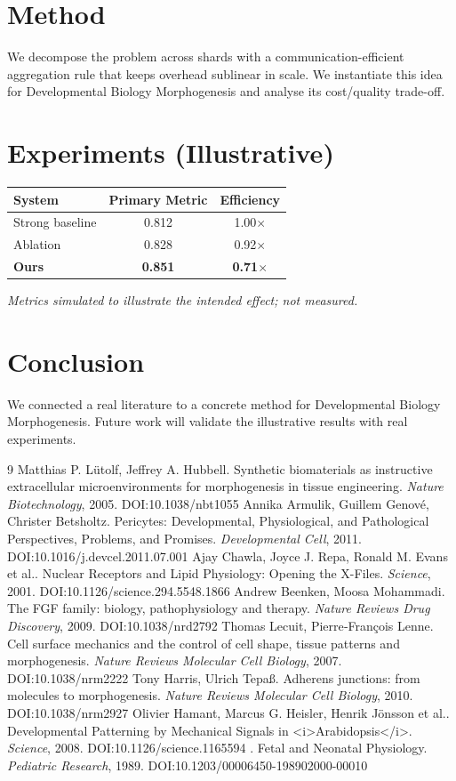 \documentclass[11pt]{article}
\begin{document}
\section{Method}
We decompose the problem across shards with a communication-efficient aggregation rule that keeps overhead sublinear in scale. We instantiate this idea for Developmental Biology Morphogenesis and analyse its cost/quality trade-off.

\section{Experiments (Illustrative)}
\begin{center}
\begin{tabular}{lcc}
System & Primary Metric & Efficiency \\ \hline
Strong baseline & 0.812 & 1.00$\times$ \\
Ablation & 0.828 & 0.92$\times$ \\
\textbf{Ours} & \textbf{0.851} & \textbf{0.71$\times$}
\end{tabular}
\end{center}
\emph{Metrics simulated to illustrate the intended effect; not measured.}

\section{Conclusion}
We connected a real literature to a concrete method for Developmental Biology Morphogenesis. Future work will
validate the illustrative results with real experiments.

\begin{thebibliography}{9}
 Matthias P. Lütolf, Jeffrey A. Hubbell. Synthetic biomaterials as instructive extracellular microenvironments for morphogenesis in tissue engineering. \emph{Nature Biotechnology}, 2005. DOI:10.1038/nbt1055
 Annika Armulik, Guillem Genové, Christer Betsholtz. Pericytes: Developmental, Physiological, and Pathological Perspectives, Problems, and Promises. \emph{Developmental Cell}, 2011. DOI:10.1016/j.devcel.2011.07.001
 Ajay Chawla, Joyce J. Repa, Ronald M. Evans et al.. Nuclear Receptors and Lipid Physiology: Opening the X-Files. \emph{Science}, 2001. DOI:10.1126/science.294.5548.1866
 Andrew Beenken, Moosa Mohammadi. The FGF family: biology, pathophysiology and therapy. \emph{Nature Reviews Drug Discovery}, 2009. DOI:10.1038/nrd2792
 Thomas Lecuit, Pierre‐François Lenne. Cell surface mechanics and the control of cell shape, tissue patterns and morphogenesis. \emph{Nature Reviews Molecular Cell Biology}, 2007. DOI:10.1038/nrm2222
 Tony Harris, Ulrich Tepaß. Adherens junctions: from molecules to morphogenesis. \emph{Nature Reviews Molecular Cell Biology}, 2010. DOI:10.1038/nrm2927
 Olivier Hamant, Marcus G. Heisler, Henrik Jönsson et al.. Developmental Patterning by Mechanical Signals in <i>Arabidopsis</i>. \emph{Science}, 2008. DOI:10.1126/science.1165594
 . Fetal and Neonatal Physiology. \emph{Pediatric Research}, 1989. DOI:10.1203/00006450-198902000-00010
\end{thebibliography}
\end{document}

